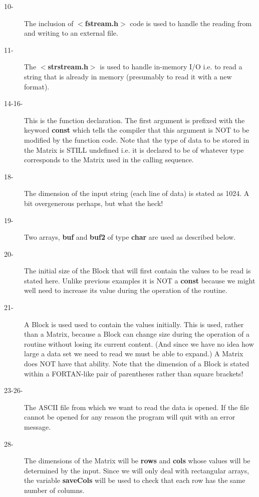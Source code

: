 \begin{description}
\item[10-] The inclusion of {\bf $<$fstream.h$>$} code is used to handle the reading from
and writing to an external file.

\item[11-] The {\bf $<$strstream.h$>$} is used to handle in-memory I/O 
i.e. to read a string that is
already in memory (presumably to read it with a new format).

\item[14-16-] This is the function declaration. The first argument is prefixed with 
the keyword {\bf const} which tells the compiler that this argument is NOT to
be modified by the function code. Note that the type of data to be stored in 
the Matrix is STILL undefined i.e. it is declared to be of whatever type
corresponds to the Matrix used in the calling sequence.

\item[18-] The dimension of the input string (each line of data) is stated as 1024.
A bit overgenerous perhaps, but what the heck!

\item[19-] Two arrays, {\bf buf} and {\bf buf2} of type {\bf char} are used as
described below.

\item[20-] The initial size of the Block that will first contain the values to be read
is stated here.  Unlike previous examples it is NOT a {\bf const} because we
might well need to increase its value during the operation of the routine.

\item[21-] A Block is used used to contain the values initially. This is used, rather
than a Matrix, because a Block can change size during the operation of a 
routine without losing its current content. (And since we have no idea how
large a data set we need to read we must be able to expand.)  A Matrix does
NOT have that ability.  Note that the dimension of a Block is stated within a
FORTAN-like pair of parentheses rather than square brackets!

\item[23-26-] The ASCII file from which we want to read the data is opened.
If the file 
cannot be opened for any reason the program will quit with an error
message.

\item[28-] The dimensions of the Matrix will be {\bf rows} and {\bf cols} whose values 
will be determined by the input. Since we will
only deal with rectangular arrays, the variable {\bf saveCols} will be used to
check that each row has the same number of columns.


\end{description}
